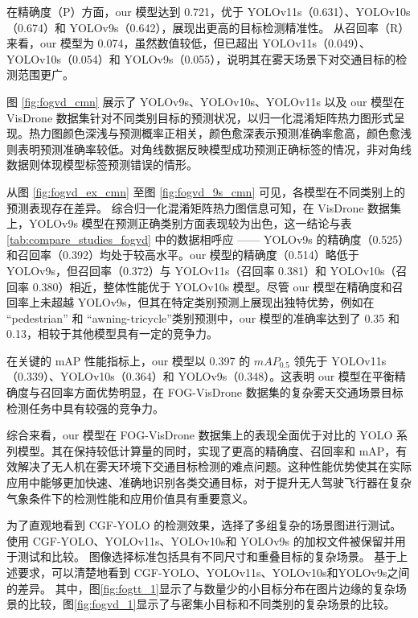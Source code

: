 在精确度（P）方面，our 模型达到 0.721，优于 YOLOv11s（0.631）、YOLOv10s（0.674）和 YOLOv9s（0.642），展现出更高的目标检测精准性。
从召回率（R）来看，our 模型为 0.074，虽然数值较低，但已超出 YOLOv11s（0.049）、YOLOv10s（0.054）和 YOLOv9s（0.055），说明其在雾天场景下对交通目标的检测范围更广。



图 \ref{fig:fogvd_cmn} 展示了 YOLOv9s、YOLOv10s、YOLOv11s 以及 our 模型在 VisDrone 数据集针对不同类别目标的预测状况，以归一化混淆矩阵热力图形式呈现。热力图颜色深浅与预测概率正相关，颜色愈深表示预测准确率愈高，颜色愈浅则表明预测准确率较低。对角线数据反映模型成功预测正确标签的情况，非对角线数据则体现模型标签预测错误的情形。



从图 \ref{fig:fogvd_ex_cmn} 至图 \ref{fig:fogvd_9s_cmn} 可见，各模型在不同类别上的预测表现存在差异。
综合归一化混淆矩阵热力图信息可知，在 VisDrone 数据集上，YOLOv9s 模型在预测正确类别方面表现较为出色，这一结论与表 \ref{tab:compare_studies_fogvd} 中的数据相呼应 —— YOLOv9s 的精确度（0.525）和召回率（0.392）均处于较高水平。our 模型的精确度（0.514）略低于 YOLOv9s，但召回率（0.372）与 YOLOv11s（召回率 0.381）和 YOLOv10s（召回率 0.380）相近，整体性能优于 YOLOv10s 模型。尽管 our 模型在精确度和召回率上未超越 YOLOv9s，但其在特定类别预测上展现出独特优势，例如在 “pedestrian” 和 “awning-tricycle”类别预测中，our 模型的准确率达到了 0.35 和 0.13，相较于其他模型具有一定的竞争力。



在关键的 mAP 性能指标上，our 模型以 0.397 的 $mAP_{0.5}$ 领先于 YOLOv11s（0.339）、YOLOv10s（0.364）和 YOLOv9s（0.348）。这表明 our 模型在平衡精确度与召回率方面优势明显，在 FOG-VisDrone 数据集的复杂雾天交通场景目标检测任务中具有较强的竞争力。



综合来看，our 模型在 FOG-VisDrone 数据集上的表现全面优于对比的 YOLO 系列模型。其在保持较低计算量的同时，实现了更高的精确度、召回率和 mAP，有效解决了无人机在雾天环境下交通目标检测的难点问题。这种性能优势使其在实际应用中能够更加快速、准确地识别各类交通目标，对于提升无人驾驶飞行器在复杂气象条件下的检测性能和应用价值具有重要意义。

为了直观地看到 CGF-YOLO 的检测效果，选择了多组复杂的场景图进行测试。 使用 CGF-YOLO、YOLOv11s、YOLOv10s和 YOLOv9s 的加权文件被保留并用于测试和比较。 图像选择标准包括具有不同尺寸和重叠目标的复杂场景。 基于上述要求，可以清楚地看到 CGF-YOLO、YOLOv11s、YOLOv10s和YOLOv9s之间的差异。 其中，图\ref{fig:fogtt_1}显示了与数量少的小目标分布在图片边缘的复杂场景的比较，图\ref{fig:fogvd_1}显示了与密集小目标和不同类别的复杂场景的比较。

